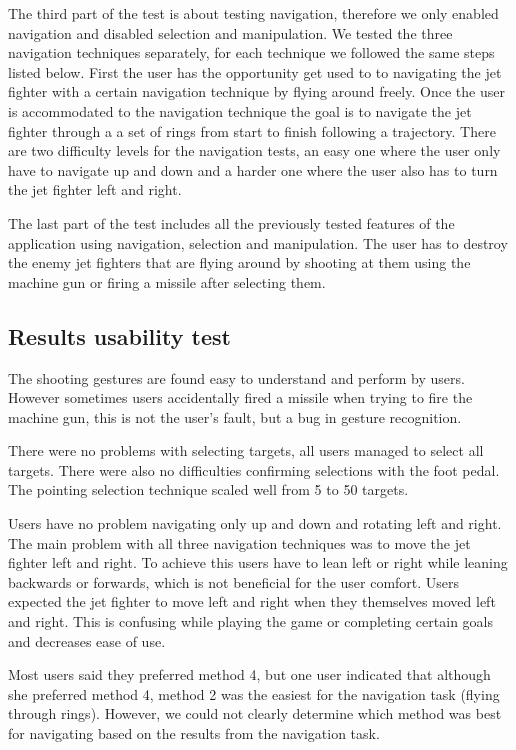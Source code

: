 \documentclass{acm_proc_article-sp}
\begin{document}
The third part of the test is about testing navigation, therefore we only enabled navigation and disabled selection and manipulation.
We tested the three navigation techniques separately, for each technique we followed the same steps listed below.
First the user has the opportunity get used to to navigating the jet fighter with a certain navigation technique by flying around freely.
Once the user is accommodated to the navigation technique the goal is to navigate the jet fighter through a a set of rings from start to finish following a trajectory.
There are two difficulty levels for the navigation tests, an easy one where the user only have to navigate up and down and a harder one where the user also has to turn the jet fighter left and right.

The last part of the test includes all the previously tested features of the application using navigation, selection and manipulation.
The user has to destroy the enemy jet fighters that are flying around by shooting at them using the machine gun or firing a missile after selecting them.

\subsection{Results usability test}
The shooting gestures are found easy to understand and perform by users. However sometimes users accidentally fired a missile when trying to fire the machine gun, this is not the user's fault, but a bug in gesture recognition.

There were no problems with selecting targets, all users managed to select all targets. There were also no difficulties confirming selections with the foot pedal.
The pointing selection technique scaled well from 5 to 50 targets.

Users have no problem navigating only up and down and rotating left and right. The main problem with all three navigation techniques was to move the jet fighter left and right. To achieve this users have to lean left or right while leaning backwards or forwards, which is not beneficial for the user comfort. Users expected the jet fighter to move left and right when they themselves moved left and right. This is confusing while playing the game or completing certain goals and decreases ease of use.

Most users said they preferred method 4, but one user indicated that although she preferred method 4, method 2 was the easiest for the navigation task (flying through rings).
However, we could not clearly determine which method was best for navigating based on the results from the navigation task.
\end{document}
